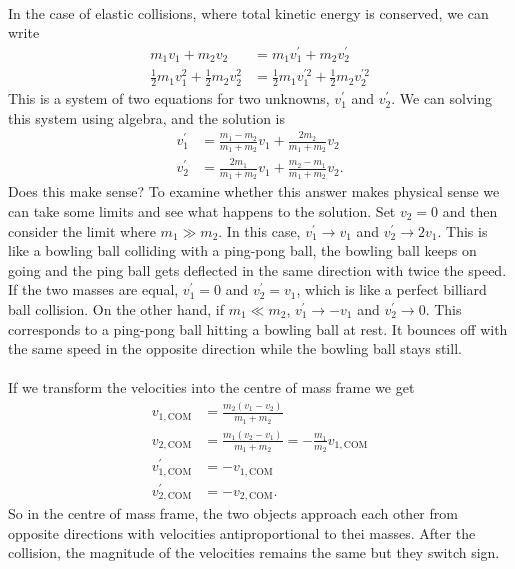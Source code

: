 \documentclass[../newtonian_mechanics.tex]{subfiles}
\begin{document}
        \paragraph{}
        In the case of elastic collisions, where total kinetic energy is conserved, we can write
        \begin{align}
            m_1v_1+m_2v_2&=m_1v_1^\prime+m_2v_2^\prime\\
            \frac{1}{2}m_1v_1^2+\frac{1}{2}m_2v_2^2&=\frac{1}{2}m_1v_1^{\prime 2}+\frac{1}{2}m_2v_2^{\prime 2}
        \end{align}
        This is a system of two equations for two unknowns, $v_1^\prime$ and $v_2^\prime$.
        We can solving this system using algebra, and the solution is
        \begin{align}
            v_1^\prime&=\frac{m_1-m_2}{m_1+m_2}v_1+\frac{2m_2}{m_1+m_2}v_2\\
            v_2^\prime&=\frac{2m_1}{m_1+m_2}v_1+\frac{m_2-m_1}{m_1+m_2}v_2.
        \end{align}
        Does this make sense?
        To examine whether this answer makes physical sense we can take some limits and see what happens to the solution.
        Set $v_2=0$ and then consider the limit where $m_1\gg m_2$.
        In this case, $v_1^\prime\to v_1$ and $v_2^\prime\to 2v_1$.
        This is like a bowling ball colliding with a ping-pong ball, the bowling ball keeps on going and the ping ball gets deflected in the same direction with twice the speed.
        If the two masses are equal, $v_1^\prime=0$ and $v_2^\prime=v_1$, which is like a perfect billiard ball collision.
        On the other hand, if $m_1\ll m_2$, $v_1^\prime\to -v_1$ and $v_2^\prime\to 0$.
        This corresponds to a ping-pong ball hitting a bowling ball at rest. It bounces off with the same speed in the opposite direction while the bowling ball stays still.

        \paragraph{}
        If we transform the velocities into the centre of mass frame we get
        \begin{align}
            v_{1,\text{COM}}&=\frac{m_2(v_1-v_2)}{m_1+m_2}\\
            v_{2,\text{COM}}&=\frac{m_1(v_2-v_1)}{m_1+m_2}=-\frac{m_1}{m_2}v_{1,\text{COM}}\\
            v_{1,\text{COM}}^\prime&=-v_{1,\text{COM}}\\
            v_{2,\text{COM}}^\prime&=-v_{2,\text{COM}}.
        \end{align}
        So in the centre of mass frame, the two objects approach each other from opposite directions with velocities antiproportional to thei masses.
        After the collision, the magnitude of the velocities remains the same but they switch sign.
\end{document}
